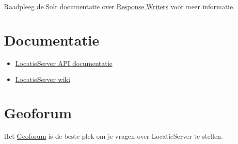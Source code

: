 \documentclass[]{book}
\providecommand{\tightlist}{%
  \setlength{\itemsep}{0pt}\setlength{\parskip}{0pt}}
\begin{document}
Raadpleeg de Solr documentatie over \href{https://lucene.apache.org/solr/guide/8_3/response-writers.html\#response-writers}{Response Writers} voor meer informatie.

\hypertarget{documentatie}{%
\section{Documentatie}\label{documentatie}}

\begin{itemize}
\tightlist
\item
  \href{https://www.pdok.nl/introductie/-/article/pdok-locatieserver}{LocatieServer API documentatie}
\item
  \href{https://github.com/PDOK/locatieserver/wiki}{LocatieServer wiki}
\end{itemize}

\hypertarget{geoforum}{%
\section{Geoforum}\label{geoforum}}

Het \href{https://geoforum.nl/c/applicaties-en-diensten/locatieserver}{Geoforum} is de beste plek om je vragen over LocatieServer te stellen.


\end{document}
